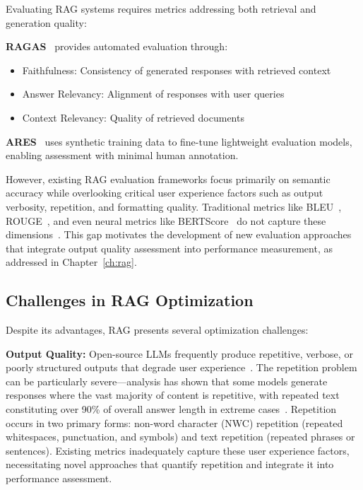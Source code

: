 Evaluating RAG systems requires metrics addressing both retrieval and generation quality:

\textbf{RAGAS}~\cite{es2023ragas} provides automated evaluation through:
\begin{itemize}[leftmargin=*]
    \item Faithfulness: Consistency of generated responses with retrieved context
    \item Answer Relevancy: Alignment of responses with user queries
    \item Context Relevancy: Quality of retrieved documents
\end{itemize}

\textbf{ARES}~\cite{saad2023ares} uses synthetic training data to fine-tune lightweight evaluation models, enabling assessment with minimal human annotation.

However, existing RAG evaluation frameworks focus primarily on semantic accuracy while overlooking critical user experience factors such as output verbosity, repetition, and formatting quality. Traditional metrics like BLEU~\cite{papineni2002bleu}, ROUGE~\cite{lin2004rouge}, and even neural metrics like BERTScore~\cite{zhang2020bertscore} do not capture these dimensions~\cite{fu2020repetition}. This gap motivates the development of new evaluation approaches that integrate output quality assessment into performance measurement, as addressed in Chapter~\ref{ch:rag}.

\subsection{Challenges in RAG Optimization}

Despite its advantages, RAG presents several optimization challenges:

\textbf{Output Quality:} Open-source LLMs frequently produce repetitive, verbose, or poorly structured outputs that degrade user experience~\cite{fu2020repetition,holtzman2019degeneration}. The repetition problem can be particularly severe---analysis has shown that some models generate responses where the vast majority of content is repetitive, with repeated text constituting over 90\% of overall answer length in extreme cases~\cite{fu2020repetition}. Repetition occurs in two primary forms: non-word character (NWC) repetition (repeated whitespaces, punctuation, and symbols) and text repetition (repeated phrases or sentences). Existing metrics inadequately capture these user experience factors, necessitating novel approaches that quantify repetition and integrate it into performance assessment.

